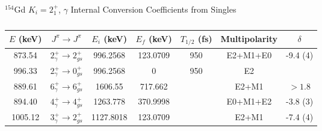 \begin{table}
    \centering
    \caption{$^{154}$Gd $K_i=2^+_1$, $\gamma$ Internal Conversion Coefficients from Singles}
    \label{tab:154Gd_Single_gamma_Disc}
\begin{ThreePartTable}
    \begin{subtable}{\textwidth}
        \caption{}
    \begin{tabular}{c|c|c|c|c|c|c}
        \toprule
        $E$ (keV)	&	$J^{\pi}	\rightarrow	J^{\pi}$	&	$E_i$ (keV)	&	$E_f$ (keV)	&	$T_{1/2}$ (fs)	&	Multipolarity	&	$\delta$\\
        \hline
        873.54	&	$2^+_{\gamma}	\rightarrow	2^+_{gs}$	&	996.2568	&	123.0709	&	950	&	E2+M1+E0	&	-9.4 (4)	\\
        \hline
        996.33	&	$2^+_{\gamma}	\rightarrow	0^+_{gs}$	&	996.2568	&	0	&	950	&	E2	&	\\
        \hline
        889.61	&	$6^+_{\gamma}	\rightarrow	6^+_{gs}$	&	1606.55	&	717.662	&		&	E2+M1	&	$>1.8$	\\
        \hline
        894.40	&	$4^+_{\gamma}	\rightarrow	4^+_{gs}$	&	1263.778	&	370.9998	&		&	E0+M1+E2	&	-3.8 (3)	\\
        \hline
        1005.12	&	$3^+_{\gamma}	\rightarrow	2^+_{gs}$	&	1127.8018	&	123.0709	&		&	E2+M1	&	-7.4 (4) \\
        \bottomrule
    \end{tabular}
    \end{subtable}
    \end{ThreePartTable}
\end{table}
